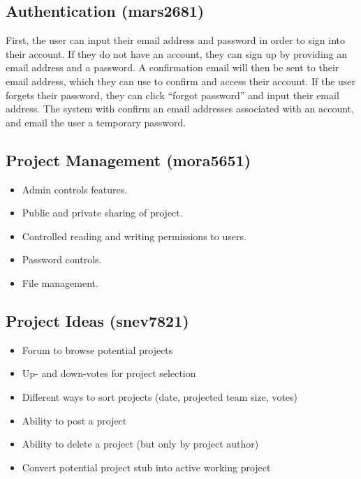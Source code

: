 \documentclass[11pt]{report}
\begin{document}
    \subsection{Authentication (mars2681)}
        First, the user can input their email address and password in order to sign into their account. If they do not have an account, they can sign up by providing an email address and a password. A confirmation email will then be sent to their email address, which they can use to confirm and access their account. If the user forgets their password, they can click “forgot password” and input their email address. The system with confirm an email addresses associated with an account, and email the user a temporary password. 
    \subsection{Project Management (mora5651)}
        \begin{itemize}
            \item Admin controls features.  
            \item Public and private sharing of project.
            \item Controlled reading and writing permissions to users. 
            \item Password controls. 
            \item File management. 
        \end{itemize}
    \subsection{Project Ideas (snev7821)}
        \begin{itemize}
            \item Forum to browse potential projects
            \item Up- and down-votes for project selection
            \item Different ways to sort projects (date, projected team size, votes)
            \item Ability to post a project
            \item Ability to delete a project (but only by project author)
            \item Convert potential project stub into active working project 
        \end{itemize}
\end{document}

